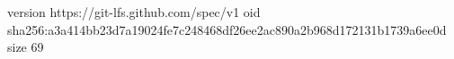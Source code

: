 version https://git-lfs.github.com/spec/v1
oid sha256:a3a414bb23d7a19024fe7c248468df26ee2ac890a2b968d172131b1739a6ee0d
size 69
